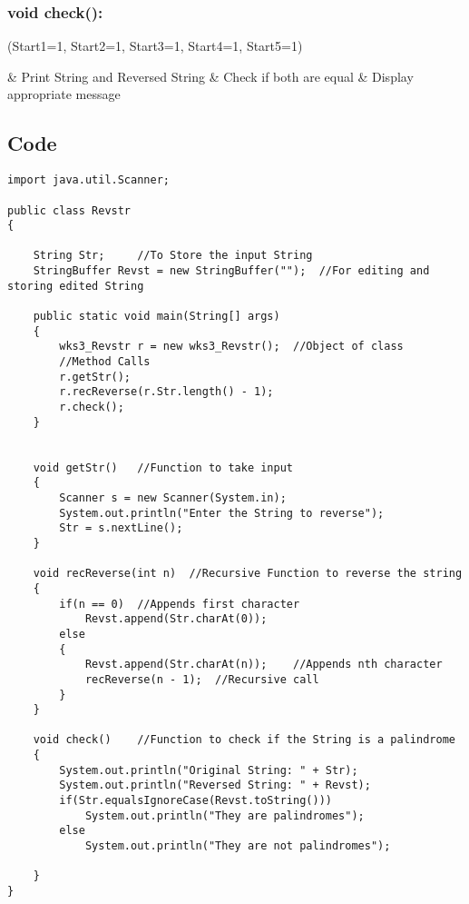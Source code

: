 \documentclass[ProgramminAssignment.tex]{subfiles}
\begin{document}
\subsubsection*{void check():}
\begin{easylist}
\ListProperties(Start1=1, Start2=1, Start3=1, Start4=1, Start5=1)

	& Print String and Reversed String
	& Check if both are equal
	& Display appropriate message
	
\end{easylist}	

\subsection{Code}
\begin{lstlisting}
import java.util.Scanner;

public class Revstr
{

	String Str;		//To Store the input String
	StringBuffer Revst = new StringBuffer("");	//For editing and storing edited String
	
	public static void main(String[] args)
	{
		wks3_Revstr r = new wks3_Revstr();	//Object of class
		//Method Calls
		r.getStr();
		r.recReverse(r.Str.length() - 1);
		r.check();
	}

	
	void getStr()	//Function to take input
	{
		Scanner s = new Scanner(System.in);
		System.out.println("Enter the String to reverse");
		Str = s.nextLine();
	}
	
	void recReverse(int n)	//Recursive Function to reverse the string
	{
		if(n == 0)	//Appends first character
			Revst.append(Str.charAt(0));
		else
		{
			Revst.append(Str.charAt(n));	//Appends nth character
			recReverse(n - 1);	//Recursive call
		}
	}
	
	void check()	//Function to check if the String is a palindrome
	{
		System.out.println("Original String: " + Str);
		System.out.println("Reversed String: " + Revst);
		if(Str.equalsIgnoreCase(Revst.toString()))
			System.out.println("They are palindromes");
		else
			System.out.println("They are not palindromes");
		
	}
}

\end{lstlisting}
\end{document}
